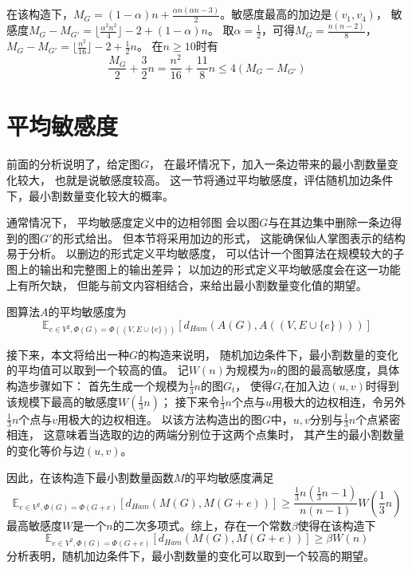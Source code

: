 在该构造下，$M_G=(1-\alpha)n+\frac{\alpha n(\alpha n-3)}2$。敏感度最高的加边是$(v_1,v_4)$，
敏感度$M_G-M_{G'}=\lfloor\frac{\alpha^2 n^2}4\rfloor-2+(1-\alpha) n$。
取$\alpha=\frac 12$，可得$M_G=\frac{n(n-2)}8$，$M_G-M_{G'}=\lfloor\frac{n^2}{16}\rfloor-2+\frac 12n$。
在$n\geq 10$时有
\begin{equation}
  \frac{M_G}2+\frac32n= \frac{n^2}{16}+\frac{11}{8}n\leq 4(M_G-M_{G'})
\end{equation}


\section{平均敏感度}
前面的分析说明了，给定图$G$，
在最坏情况下，加入一条边带来的最小割数量变化较大，
也就是说敏感度较高。
这一节将通过平均敏感度，评估随机加边条件下，最小割数量变化较大的概率。

通常情况下，
平均敏感度定义中的边相邻图
会以图$G$与在其边集中删除一条边得到的图$G'$的形式给出。\cite{varma2023average}
但本节将采用加边的形式，
这能确保仙人掌图表示的结构易于分析。
以删边的形式定义平均敏感度，
可以估计一个图算法在规模较大的子图上的输出和完整图上的输出差异；
以加边的形式定义平均敏感度会在这一功能上有所欠缺，
但能与前文内容相结合，来给出最小割数量变化值的期望。

\begin{definition}
  图算法$A$的平均敏感度为
  \begin{equation}
    \mathbb E_{e\in V^2,\Phi(G)=\Phi((V,E\cup\{e\}))}[d_{Ham}(A(G),A((V,E\cup\{e\})))]
  \end{equation}
\end{definition}

接下来，本文将给出一种$G$的构造来说明，
随机加边条件下，最小割数量的变化的平均值可以取到一个较高的值。
记$W(n)$为规模为$n$的图的最高敏感度，具体构造步骤如下：
首先生成一个规模为$\frac 13n$的图$G_t$，
使得$G_t$在加入边$(u,v)$时得到该规模下最高的敏感度$W(\frac 13n)$；
接下来令$\frac 13n$个点与$u$用极大的边权相连，令另外$\frac 13n$个点与$v$用极大的边权相连。
以该方法构造出的图$G$中，$u,v$分别与$\frac 13n$个点紧密相连，
这意味着当选取的边的两端分别位于这两个点集时，
其产生的最小割数量的变化等价与边$(u,v)$。

因此，在该构造下最小割数量函数$M$的平均敏感度满足
\begin{equation}
  \mathbb E_{e\in V^2,\Phi(G)=\Phi(G+e)}[d_{Ham}(M(G),M(G+e))]\geq \frac{\frac 13n(\frac 13n-1)}{n(n-1)}W(\frac 13n)
\end{equation}
最高敏感度$W$是一个$n$的二次多项式。综上，存在一个常数$\beta$使得在该构造下
\begin{equation}
  \mathbb E_{e\in V^2,\Phi(G)=\Phi(G+e)}[d_{Ham}(M(G),M(G+e))]\geq \beta W(n)
\end{equation}
分析表明，随机加边条件下，最小割数量的变化可以取到一个较高的期望。